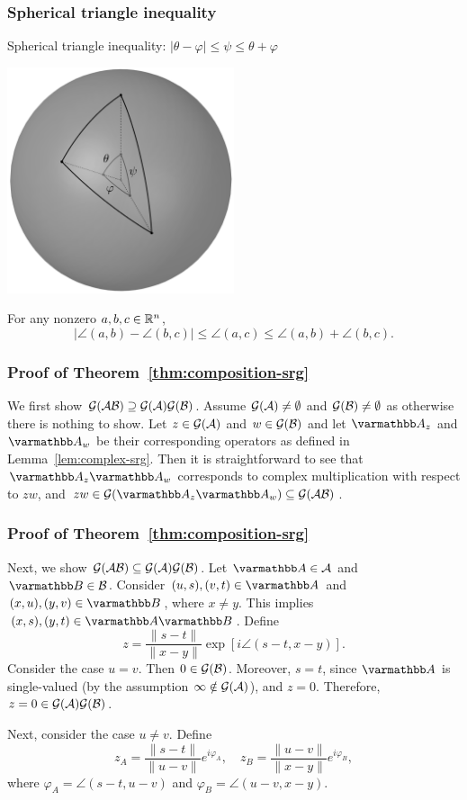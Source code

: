 \documentclass[10pt,mathserif]{beamer}
\begin{document}
\begin{frame}
\frametitle{Spherical triangle inequality}
Spherical triangle inequality: $|\theta-\varphi|\le \psi\le \theta+\varphi$
\begin{center}
\includegraphics[width=0.5\textwidth]{spherical_triangle.png}
\end{center}

For any nonzero $a,b,c\in \mathbb{R}^n$,
\[\left|\angle (a,b)-\angle (b,c)\right|
\le \angle (a,c)\le 
 \angle (a,b)+\angle (b,c).
\]
\end{frame}




\begin{frame}
\frametitle{Proof of Theorem~\ref{thm:composition-srg}}
We first show ${\mathcal{G}}({\mathcal{A}}{\mathcal{B}})\supseteq {\mathcal{G}}({\mathcal{A}}){\mathcal{G}}({\mathcal{B}})$.
Assume ${\mathcal{G}}({\mathcal{A}})\ne \emptyset$ and ${\mathcal{G}}({\mathcal{B}})\ne \emptyset$ as otherwise there is nothing to show.
Let $z\in {\mathcal{G}}({\mathcal{A}})$ and $w\in {\mathcal{G}}({\mathcal{B}})$
and let $\opA_z$ and $\opA_w$ be their corresponding operators as defined in Lemma~\ref{lem:complex-srg}.
Then it is straightforward to see that
$\opA_z\opA_w$ corresponds to complex multiplication
with respect to $zw$,
and $zw\in \cG(\opA_z\opA_w)\subseteq \cG(\cA\cB)$.
\end{frame}

\begin{frame}
\frametitle{Proof of Theorem~\ref{thm:composition-srg}}
Next, we show ${\mathcal{G}}({\mathcal{A}}{\mathcal{B}})\subseteq {\mathcal{G}}({\mathcal{A}}){\mathcal{G}}({\mathcal{B}})$.
Let $\opA\in \cA$ and $\opB\in \cB$.
Consider $(u,s),(v,t)\in \opA$ and $(x,u),(y,v)\in \opB$, where $x\ne y$.
This implies $(x,s),(y,t)\in \opA\opB$.
Define
\[
z=\frac{\|s-t\|}{\|x-y\|}
\exp\left[
i\angle (s-t,x-y)
\right].
\]
Consider the case $u=v$. Then $0\in {\mathcal{G}}({\mathcal{B}})$.
Moreover, $s=t$, since $\opA$ is single-valued (by the assumption $\infty\notin {\mathcal{G}}({\mathcal{A}})$), and $z=0$.
Therefore, $z=0\in {\mathcal{G}}({\mathcal{A}}){\mathcal{G}}({\mathcal{B}})$.

Next, consider the case $u\ne v$.
Define
\[
z_A=\frac{\|s-t\|}{\|u-v\|}
e^{i\varphi_A}
,\quad
z_B=\frac{\|u-v\|}{\|x-y\|}
e^{i\varphi_B}
,
\]
where $\varphi_A=\angle (s-t,u-v)$ and $\varphi_B= \angle (u-v,x-y)$.
\end{frame}
\end{document}
